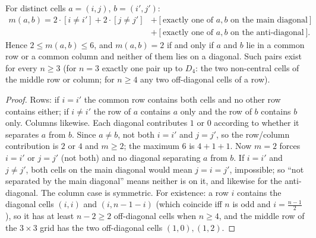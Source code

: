 \begin{lemma}
\label{lem:m_values}
For distinct cells $a=(i,j)$, $b=(i',j')$:
\begin{align*}
m(a,b)=2\cdot[i\ne i']+2\cdot[j\ne j']&+[\text{exactly one of }a,b\text{ on the main diagonal}]\\
&+[\text{exactly one of }a,b\text{ on the anti-diagonal}].
\end{align*}
Hence $2\le m(a,b)\le6$, and $m(a,b)=2$ if and only if $a$ and $b$ lie in a common row or a common column and
neither of them lies on a diagonal.  Such pairs exist for every $n\ge3$ (for $n=3$ exactly one pair up to $D_4$:
the two non-central cells of the middle row or column; for $n\ge4$ any two off-diagonal cells of a row).
\end{lemma}

\begin{proof}
Rows: if $i=i'$ the common row contains both cells and no other row contains either; if $i\ne i'$ the row of $a$
contains $a$ only and the row of $b$ contains $b$ only.  Columns likewise.  Each diagonal contributes $1$ or $0$
according to whether it separates $a$ from $b$.  Since $a\ne b$, not both $i=i'$ and $j=j'$, so the row/column
contribution is $2$ or $4$ and $m\ge2$; the maximum $6$ is $4+1+1$.  Now $m=2$ forces $i=i'$ or $j=j'$ (not both) and
no diagonal separating $a$ from $b$.  If $i=i'$ and $j\ne j'$, both cells on the main diagonal would mean $j=i=j'$,
impossible; so ``not separated by the main diagonal'' means neither is on it, and likewise for the anti-diagonal.
The column case is symmetric.  For existence: a row $i$ contains the diagonal cells $(i,i)$ and $(i,n-1-i)$ (which
coincide iff $n$ is odd and $i=\frac{n-1}2$), so it has at least $n-2\ge2$ off-diagonal cells when $n\ge4$, and the
middle row of the $3\times3$ grid has the two off-diagonal cells $(1,0),(1,2)$.
\end{proof}

